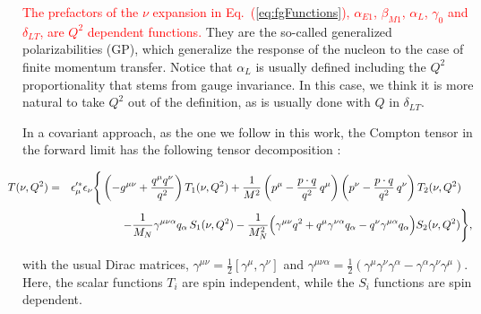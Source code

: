 \documentclass[twocolumn,prc,showpacs,nofootinbib,preprintnumbers,amsmath,amssymb,superscriptaddress]{revtex4-1}
\def\bea{\begin{eqnarray}}
\def\eea{\end{eqnarray}}
\def\eqlab#1{\label{eq:#1}}
\def\Eqref#1{Eq.~(\ref{eq:#1})}
\def\al{\alpha}
\def\ga{\gamma} \def\Ga{{\it\Gamma}}
\def\nn{\nonumber}
\begin{document}
\textcolor{red}{The prefactors of the $\nu$ expansion in \Eqref{fgFunctions}, $\alpha_{E1}$, $\beta_{M1}$, $\alpha_{L}$, $\gamma_{0}$ and $\delta_{LT}$, are $Q^2$ dependent functions.}
They  are the so-called generalized polarizabilities (GP), which generalize the response of the nucleon to the case of finite momentum transfer. Notice that $\alpha_L$ is usually defined including the $Q^2$ proportionality that stems from gauge invariance. 
In this case, we think it is more natural to take $Q^2$ out of the definition, as is usually done with $Q$ in $\delta_{LT}$.

In a covariant approach, as the one we follow in this work, the Compton tensor in the forward limit has the following tensor decomposition \cite{Hagelstein:2015egb}:
\begin{widetext}
\bea
\label{Eq:T-Rel}
\hspace{-0.5cm}T(\nu,Q^2) & = &  \epsilon_{\mu}^{\prime *} \epsilon_\nu \Bigg\{ 
\left( -g^{\mu\nu}+\frac{q^{\mu}q^{\nu}}{q^2}\right)
T_1(\nu, Q^2) +\frac{1}{M^2} \left(p^{\mu}-\frac{p\cdot
q}{q^2}\,q^{\mu}\right) \left(p^{\nu}-\frac{p\cdot
q}{q^2}\, q^{\nu} \right) T_2(\nu, Q^2)\nn\quad\\
&&-   \frac{1}{M_N}\gamma^{\mu \nu \al} q_\al \,S_1(\nu, Q^2)  -  
\frac{1}{M_N^2} \Big( \gamma^{\mu\nu} q^2 + q^\mu \gamma^{\nu\al} q_\al  -  q^\nu \gamma^{\mu\al}
q_\al \Big) S_2(\nu, Q^2)\Bigg\},
\eqlab{fVVCS}
\eea
\end{widetext}
with the usual Dirac matrices, $\gamma^{\mu \nu}=\frac{1}{2}\left[\gamma^\mu,\gamma^\nu\right]$ and 
$\gamma^{\mu \nu \al}=\frac{1}{2} \left(\gamma^\mu\gamma^\nu \ga^\al-\ga^\al \ga^\nu \ga^\mu \right)$.
Here, the scalar functions $T_i$ are spin independent, while the $S_i$ functions are spin dependent.
\end{document}
